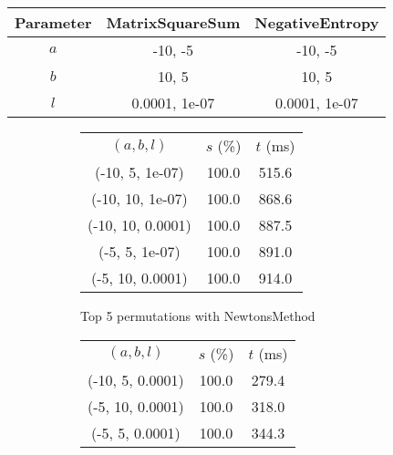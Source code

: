 \begin{center}
\label{tab:params_GoldenSectionSearch}
\begin{tabular}{|c|c|c|}
\hline
\rowcolor{gray!25}
Parameter & MatrixSquareSum & NegativeEntropy \\
\hline
$a$ & -10, -5 & -10, -5 \\
$b$ & 10, 5 & 10, 5 \\
$l$ & 0.0001, 1e-07 & 0.0001, 1e-07 \\
\hline
\end{tabular}
\end{center}

\begin{figure}[H]
\label{fig:param_comp_MatrixSquareSum_GoldenSectionSearch}
\begin{subfigure}[ht]{.5\textwidth}
\begin{tabular}{|c|c|c|}
\hline
\rowcolor{gray!25}
\multicolumn{3}{|c|}{NewtonsMethod} \\
\hline
\rowcolor{gray!25}
$(a,b,l)$ & $s$ (\%) & $t$ (ms) \\
\hline
(-10, 5, 1e-07) & 100.0 & 515.6 \\
(-10, 10, 1e-07) & 100.0 & 868.6 \\
(-10, 10, 0.0001) & 100.0 & 887.5 \\
(-5, 5, 1e-07) & 100.0 & 891.0 \\
(-5, 10, 0.0001) & 100.0 & 914.0 \\
\hline
\end{tabular}
\caption{Top 5 permutations with NewtonsMethod}
\label{subfig:param_comp_MatrixSquareSum_NewtonsMethod_GoldenSectionSearch}
\end{subfigure}
\hfill
\begin{subfigure}[ht]{.5\textwidth}
\begin{tabular}{|c|c|c|}
\hline
\rowcolor{gray!25}
\multicolumn{3}{|c|}{GradientDescentMethod} \\
\hline
\rowcolor{gray!25}
$(a,b,l)$ & $s$ (\%) & $t$ (ms) \\
\hline
(-10, 5, 0.0001) & 100.0 & 279.4 \\
(-5, 10, 0.0001) & 100.0 & 318.0 \\
(-5, 5, 0.0001) & 100.0 & 344.3 \\

\end{tabular}
\end{subfigure}
\end{figure}
